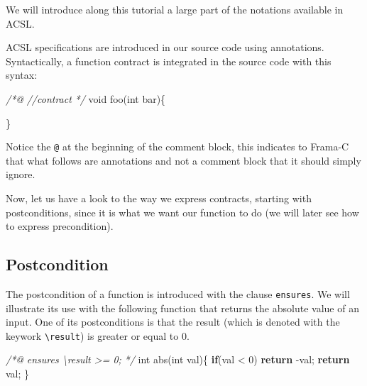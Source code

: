 \documentclass[12pt,francais,]{scrbook}
\newenvironment{Shaded}{}{}
\newcommand{\KeywordTok}[1]{\textcolor[rgb]{0.00,0.44,0.13}{\textbf{{#1}}}}
\newcommand{\DataTypeTok}[1]{\textcolor[rgb]{0.56,0.13,0.00}{{#1}}}
\newcommand{\DecValTok}[1]{\textcolor[rgb]{0.25,0.63,0.44}{{#1}}}
\newcommand{\CommentTok}[1]{\textcolor[rgb]{0.38,0.63,0.69}{\textit{{#1}}}}
\newcommand{\NormalTok}[1]{{#1}}
\begin{document}
We will introduce along this tutorial a large part of the notations
available in ACSL.

ACSL specifications are introduced in our source code using annotations.
Syntactically, a function contract is integrated in the source code with
this syntax:

\begin{footnotesize}\begin{Shaded}
\begin{Highlighting}[]
\CommentTok{/*@}
\CommentTok{  //contract}
\CommentTok{*/}
\DataTypeTok{void} \NormalTok{foo(}\DataTypeTok{int} \NormalTok{bar)\{}

\NormalTok{\}}
\end{Highlighting}
\end{Shaded}\end{footnotesize}

Notice the \texttt{@} at the beginning of the comment block, this
indicates to Frama-C that what follows are annotations and not a comment
block that it should simply ignore.

Now, let us have a look to the way we express contracts, starting with
postconditions, since it is what we want our function to do (we will
later see how to express precondition).

\subsection{Postcondition}\label{postcondition}

The postcondition of a function is introduced with the clause
\texttt{ensures}. We will illustrate its use with the following function
that returns the absolute value of an input. One of its postconditions
is that the result (which is denoted with the keywork
\texttt{\textbackslash{}result}) is greater or equal to 0.

\begin{footnotesize}\begin{Shaded}
\begin{Highlighting}[]
\CommentTok{/*@}
\CommentTok{  ensures \textbackslash{}result >= 0;}
\CommentTok{*/}
\DataTypeTok{int} \NormalTok{abs(}\DataTypeTok{int} \NormalTok{val)\{}
  \KeywordTok{if}\NormalTok{(val < }\DecValTok{0}\NormalTok{) }\KeywordTok{return} \NormalTok{-val;}
  \KeywordTok{return} \NormalTok{val;}
\NormalTok{\}}
\end{Highlighting}
\end{Shaded}\end{footnotesize}
\end{document}
